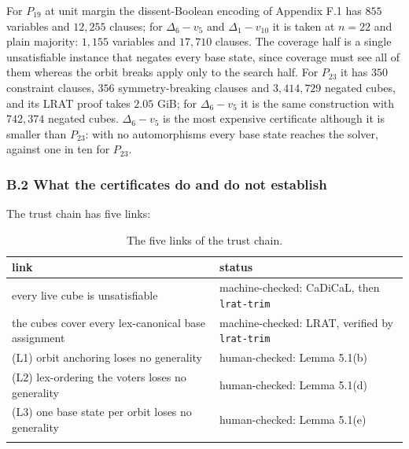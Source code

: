 \documentclass[
]{article}
\begin{document}

For \(P_{19}\) at unit margin the dissent-Boolean encoding of Appendix
F.1 has \(855\) variables and \(12{,}255\) clauses; for
\(\Delta_6 - v_{5}\) and \(\Delta_1 - v_{10}\) it is taken at \(n = 22\)
and plain majority: \(1{,}155\) variables and \(17{,}710\) clauses. The
coverage half is a single unsatisfiable instance that negates every base
state, since coverage must see all of them whereas the orbit breaks
apply only to the search half. For \(P_{23}\) it has \(350\) constraint
clauses, \(356\) symmetry-breaking clauses and \(3{,}414{,}729\) negated
cubes, and its LRAT proof takes \(2.05\) GiB; for \(\Delta_6 - v_{5}\)
it is the same construction with \(742{,}374\) negated cubes.
\(\Delta_6 - v_{5}\) is the most expensive certificate although it is
smaller than \(P_{23}\): with no automorphisms every base state reaches
the solver, against one in ten for \(P_{23}\).

\subsubsection{B.2 What the certificates do and do not
establish}\label{b.2-what-the-certificates-do-and-do-not-establish}

The trust chain has five links:

\begin{table}[!htbp]
\centering
\caption{The five links of the trust chain.}
\begin{tabular}{@{}
  >{\raggedright\arraybackslash}p{}
  >{\raggedright\arraybackslash}p{}@{}}
\toprule\noalign{}
\begin{minipage}[b]{\linewidth}\raggedright
link
\end{minipage} & \begin{minipage}[b]{\linewidth}\raggedright
status
\end{minipage} \\
\midrule\noalign{}

every live cube is unsatisfiable & machine-checked: CaDiCaL, then
\texttt{lrat-trim} \\
the cubes cover every lex-canonical base assignment & machine-checked:
LRAT, verified by \texttt{lrat-trim} \\
(L1) orbit anchoring loses no generality & human-checked: Lemma
5.1(b) \\
(L2) lex-ordering the voters loses no generality & human-checked: Lemma
5.1(d) \\
(L3) one base state per orbit loses no generality & human-checked: Lemma
5.1(e) \\
\bottomrule\noalign{}
\end{tabular}
\end{table}
\end{document}
